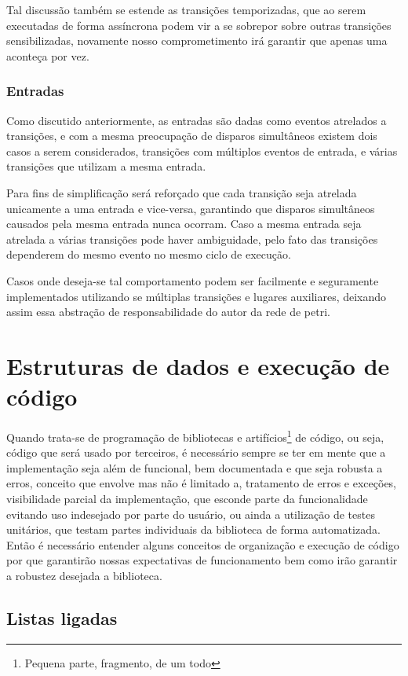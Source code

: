 Tal discussão também se estende as transições temporizadas, que ao serem executadas de forma assíncrona podem vir a se sobrepor sobre outras transições sensibilizadas, novamente nosso comprometimento irá garantir que apenas uma aconteça por vez.  

\subsubsection{Entradas}

Como discutido anteriormente, as entradas são dadas como eventos atrelados a transições, e com a mesma preocupação de disparos simultâneos existem dois casos a serem considerados, transições com múltiplos eventos de entrada, e várias transições que utilizam a mesma entrada.

Para fins de simplificação será reforçado que cada transição seja atrelada unicamente a uma entrada e vice-versa, garantindo que disparos simultâneos causados pela mesma entrada nunca ocorram. Caso a mesma entrada seja atrelada a várias transições pode haver ambiguidade, pelo fato das transições dependerem do mesmo evento no mesmo ciclo de execução.

Casos onde deseja-se tal comportamento podem ser facilmente e seguramente implementados utilizando se múltiplas transições e lugares auxiliares, deixando assim essa abstração de responsabilidade do autor da rede de petri.

\section{Estruturas de dados e execução de código}

Quando trata-se de programação de bibliotecas e artifícios\footnote{Pequena parte, fragmento, de um todo} de código, ou seja, código que será usado por terceiros, é necessário sempre se ter em mente que a implementação seja além de funcional, bem documentada e que seja robusta a erros, conceito que envolve mas não é limitado a, tratamento de erros e exceções, visibilidade parcial da implementação, que esconde parte da funcionalidade evitando uso indesejado por parte do usuário, ou ainda a utilização de testes unitários, que testam partes individuais da biblioteca de forma automatizada. Então é necessário entender alguns conceitos de organização e execução de código por que garantirão nossas expectativas de funcionamento bem como irão garantir a robustez desejada a biblioteca. 

\subsection{Listas ligadas}

